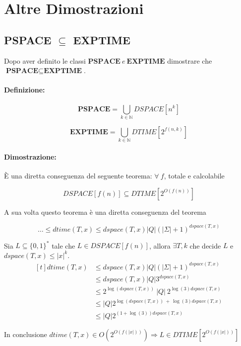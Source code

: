 \section{Altre Dimostrazioni}

\subsection{\textbf{PSPACE} $\subseteq$ \textbf{EXPTIME}}

Dopo aver definito le classi $\textbf{PSPACE}\ e\ \textbf{EXPTIME}$ dimostrare che $\textbf{PSPACE} \subseteq \textbf{EXPTIME}$.

\paragraph*{Definizione:} 
\[
    \textbf{PSPACE} = \bigcup_{k\in \mathbb{N}} DSPACE[n^k]
\]
 
\[
    \textbf{EXPTIME} = \bigcup_{k\in \mathbb{N}} DTIME[2^{f(n, k)}]
\]

\paragraph*{Dimostrazione:} È una diretta conseguenza del seguente teorema: $\forall\ f$, totale e calcolabile

$$DSPACE[f(n)] \subseteq DTIME[2^{O(f(n))}]$$ 

A sua volta questo teorema è una diretta conseguenza del teorema

$$\dots \leq dtime(T, x) \leq dspace(T, x)|Q|(|\Sigma| + 1)^{dspace(T, x)}$$

Sia $L \subseteq \{0, 1\}^*$ tale che $L \in DSPACE[f(n)]$, allora $\exists T, k$ che decide $L$ e $dspace(T, x) \leq |x|^k$.
\[
    \begin{aligned}[t]
    dtime(T, x) &\leq dspace(T, x)|Q|(|\Sigma| + 1)^{dspace(T, x)} \\
                 &\leq dspace(T, x)|Q|3^{dspace(T, x)}\\
                 &\leq 2^{\log(dspace(T,x))}\ |Q|\ 2^{\log(3)dspace(T, x)}\\
                 &\leq |Q|2^{\log(dspace(T,x))\ +\ \log(3)dspace(T, x)}\\
                 &\leq |Q|2^{(1 + \log(3))dspace(T, x)}
    \end{aligned}
\]

In conclusione $dtime(T, x) \in O(2^{O(f(|x|))}) \Rightarrow L \in DTIME[2^{O(f(|x|))}]$

